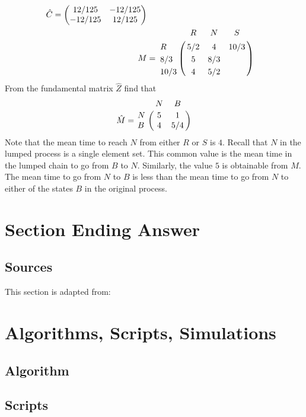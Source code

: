 \documentclass[12pt]{article}
\begin{document}
\begin{example}
\begin{example}
\begin{align*}
    \hat{C} =
    \begin{pmatrix}
      12/125  & -12/125 \\
    -12/125   &  12/125
  \end{pmatrix} \\
    M &= \bordermatrix{
        & R & N & S \cr
    R & 5/2 & 4 & 10/3 \cr
    8/3 & 5 & 8/3 \cr
    10/3 & 4 & 5/2          
               }
  \end{align*}
  From the fundamental matrix \( \hat{Z} \) find that
  \[
    \hat{M} = \bordermatrix{
      & N & B \cr
      N & 5 & 1 \cr
      B & 4 & 5/4
    }
  \]
Note that the mean time to reach \( N \) from either \( R \) or \( S
\) is \( 4 \).  Recall that \( N \) in the lumped process is a single
element set.  This common value is the mean time in the lumped chain
to go from $B$ to $N$.  Similarly, the value \( 5 \) is obtainable
from \( M \).  The mean time to go from $N$ to $B$ is less than the
mean time to go from $N$ to either of the states $B$ in the original
process.

\end{example}

\section*{Section Ending Answer}

\subsection*{Sources}
This section is adapted from: 

\nocite{}
\nocite{}

\hr

\section*{Algorithms, Scripts, Simulations}

\subsection*{Algorithm}

\subsection*{Scripts}


\end{example}
\end{document}
